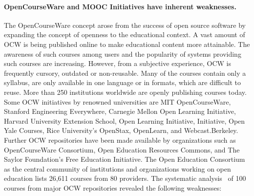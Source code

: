 \documentclass[ngerman,UKenglish,table]{scrbook}
\begin{document}
\paragraph{OpenCourseWare and MOOC Initiatives have inherent weaknesses.}
The OpenCourseWare concept arose from the success of open source software by expanding the concept of openness to the educational context.
A vast amount of OCW is being published online to make educational content more attainable.
The awareness of such courses among users and the popularity of systems providing such courses are increasing.
However, from a subjective experience, OCW is frequently cursory, outdated or non-reusable.
Many of the courses contain only a syllabus, are only available in one language or in formats, which are difficult to reuse.
More than 250 institutions worldwide are openly publishing courses today.
Some OCW initiatives by renowned universities are MIT OpenCourseWare, Stanford Engineering Everywhere, Carnegie Mellon Open Learning Initiative, Harvard University Extension School, Open Learning Initiative, Initiative, Open Yale Courses, Rice University’s OpenStax, OpenLearn, and Webcast.Berkeley.
Further OCW repositories have been made available by organizations such as OpenCourseWare Consortium, Open Education Resources Commons, and The Saylor Foundation’s Free Education Initiative.
The Open Education Consortium as the central community of institutions and organizations working on open education lists 26,611 courses from 80 providers.
The systematic analysis~\cite{sahar_vahdati_2015_14756} of 100 courses from major OCW repositories revealed the following weaknesses:
\end{document}
